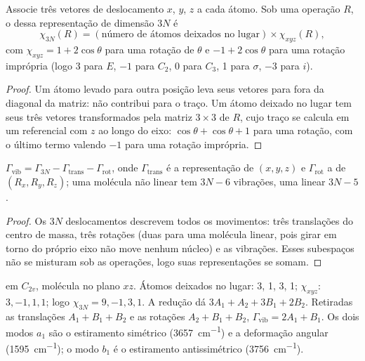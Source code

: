 \begin{proposition}\label{prop:b3:group-theory-applied:gamma-3n}
Associe três vetores de deslocamento $x$, $y$, $z$ a cada átomo. Sob uma
operação $R$, o  dessa representação de dimensão $3N$ é
\[
\chi_{3N}(R) = (\text{número de átomos deixados no lugar}) \times \chi_{xyz}(R),
\]
com $\chi_{xyz} = 1 + 2\cos\theta$ para uma rotação de $\theta$ e $-1 + 2\cos\theta$
para uma rotação imprópria (logo 3 para $E$, $-1$ para $C_2$, 0 para $C_3$, 1 para $\sigma$,
$-3$ para $i$).
\end{proposition}

\begin{proof}
Um átomo levado para outra posição leva seus vetores para fora da diagonal da
matriz: não contribui para o traço. Um átomo deixado no lugar tem seus três
vetores transformados pela matriz $3\times3$ de $R$, cujo traço se calcula em um
referencial com $z$ ao longo do eixo: $\cos\theta + \cos\theta + 1$ para uma
rotação, com o último termo valendo $-1$ para uma rotação imprópria.
\end{proof}

\begin{proposition}\label{prop:b3:group-theory-applied:mode-count}
$\Gamma_{\mathrm{vib}} = \Gamma_{3N} - \Gamma_{\mathrm{trans}} - \Gamma_{\mathrm{rot}}$, onde
$\Gamma_{\mathrm{trans}}$ é a representação de $(x, y, z)$ e $\Gamma_{\mathrm{rot}}$ a
de $(R_x, R_y, R_z)$; uma molécula não linear tem $3N - 6$ vibrações, uma linear
$3N - 5$.
\end{proposition}

\begin{proof}
Os $3N$ deslocamentos descrevem todos os movimentos: três translações do
centro de massa, três rotações (duas para uma molécula linear, pois girar em
torno do próprio eixo não move nenhum núcleo) e as vibrações. Esses
subespaços não se misturam sob as operações, logo suas representações se somam.
\end{proof}

\begin{example}[A água]\label{ex:b3:group-theory-applied:water}
 em $C_{2v}$, molécula no plano $xz$. Átomos deixados no lugar: 3, 1, 3, 1;
$\chi_{xyz}$: $3, -1, 1, 1$; logo $\chi_{3N} = 9, -1, 3, 1$. A redução dá $3A_1 +
A_2 + 3B_1 + 2B_2$. Retiradas as translações $A_1 + B_1 + B_2$ e as rotações $A_2 + B_1 + B_2$,
$\Gamma_{\mathrm{vib}} = 2A_1 + B_1$. Os dois modos $a_1$ são o estiramento
simétrico (\qty{3657}{cm^{-1}}) e a deformação angular (\qty{1595}{cm^{-1}}); o modo $b_1$ é
o estiramento antissimétrico (\qty{3756}{cm^{-1}}).
\end{example}

